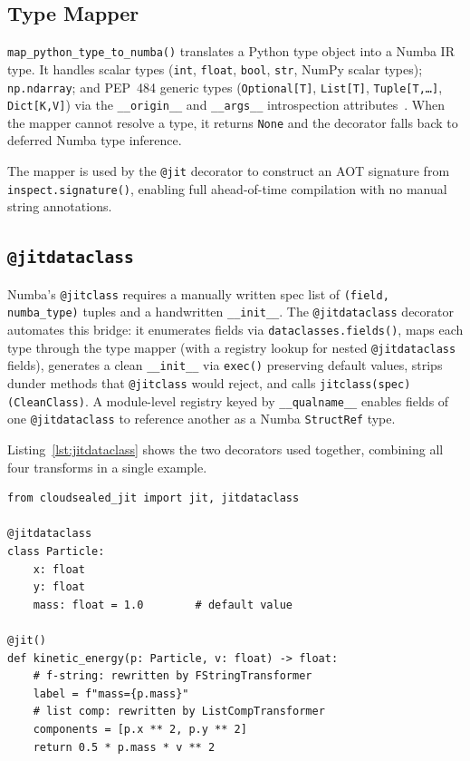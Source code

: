 \documentclass[journal]{IEEEtran}
\begin{document}
\subsection{Type Mapper}

\texttt{map\_python\_type\_to\_numba()} translates a Python type object into a
Numba IR type. It handles scalar types (\texttt{int}, \texttt{float},
\texttt{bool}, \texttt{str}, NumPy scalar types); \texttt{np.ndarray}; and
PEP~484 generic types (\texttt{Optional[T]}, \texttt{List[T]},
\texttt{Tuple[T,\ldots]}, \texttt{Dict[K,V]}) via the \texttt{\_\_origin\_\_}
and \texttt{\_\_args\_\_} introspection attributes~\cite{vanrossum2014pep484}.
When the mapper cannot resolve a type, it returns \texttt{None} and the
decorator falls back to deferred Numba type inference.

The mapper is used by the \texttt{@jit} decorator to construct an AOT
signature from \texttt{inspect.signature()}, enabling full ahead-of-time
compilation with no manual string annotations.

\subsection{\texttt{@jitdataclass}}

Numba's \texttt{@jitclass} requires a manually written spec list of
\texttt{(field, numba\_type)} tuples and a handwritten \texttt{\_\_init\_\_}.
The \texttt{@jitdataclass} decorator automates this bridge: it enumerates
fields via \texttt{dataclasses.fields()}, maps each type through the type
mapper (with a registry lookup for nested \texttt{@jitdataclass} fields),
generates a clean \texttt{\_\_init\_\_} via \texttt{exec()} preserving default
values, strips dunder methods that \texttt{@jitclass} would reject, and calls
\texttt{jitclass(spec)(CleanClass)}. A module-level registry keyed by
\texttt{\_\_qualname\_\_} enables fields of one \texttt{@jitdataclass} to
reference another as a Numba \texttt{StructRef} type.

Listing~\ref{lst:jitdataclass} shows the two decorators used together,
combining all four transforms in a single example.

\begin{lstlisting}[style=python, caption={\texttt{@jitdataclass} and \texttt{@jit}: all transforms active.}, label={lst:jitdataclass}]
from cloudsealed_jit import jit, jitdataclass

@jitdataclass
class Particle:
    x: float
    y: float
    mass: float = 1.0        # default value

@jit()
def kinetic_energy(p: Particle, v: float) -> float:
    # f-string: rewritten by FStringTransformer
    label = f"mass={p.mass}"
    # list comp: rewritten by ListCompTransformer
    components = [p.x ** 2, p.y ** 2]
    return 0.5 * p.mass * v ** 2
\end{lstlisting}
\end{document}
